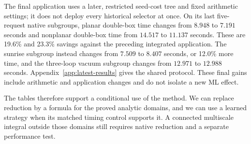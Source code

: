

The final application uses a later, restricted seed-cost tree and fixed arithmetic settings; it does not deploy every historical selector at once. On its last five-request native subgroups, planar double-box time changes from $8.948$ to $7.191$ seconds and nonplanar double-box time from $14.517$ to $11.137$ seconds. These are 19.6\% and 23.3\% savings against the preceding integrated application. The sunrise subgroup instead changes from $7.509$ to $8.407$ seconds, or 12.0\% more time, and the three-loop vacuum subgroup changes from $12.971$ to $12.988$ seconds. Appendix~\ref{app:latest-results} gives the shared protocol. These final gains include arithmetic and application changes and do not isolate a new ML effect.

The tables therefore support a conditional use of the method. We can replace reduction by a formula for the proved analytic domains, and we can use a learned strategy when its matched timing control supports it. A connected multiscale integral outside those domains still requires native reduction and a separate performance test.
\FloatBarrier
